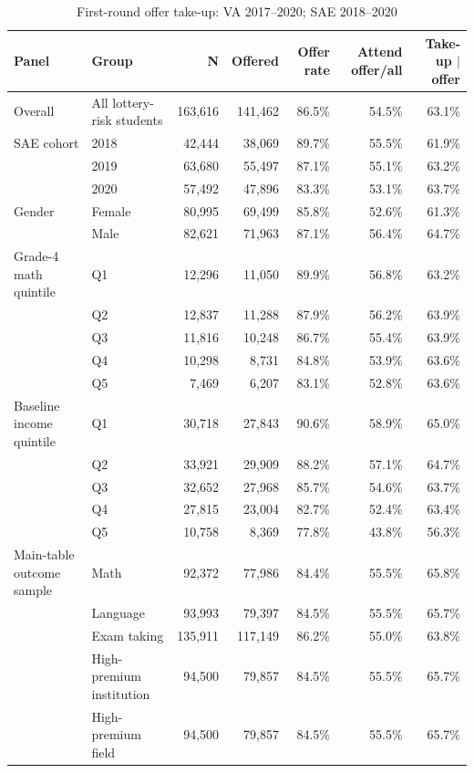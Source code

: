 \begin{table}[!htbp]
\centering
\caption{First-round offer take-up: VA 2017--2020; SAE 2018--2020}
\label{tab:offer-takeup-maximum-data}
\begin{tabular}{llrrrrr}
\toprule
Panel & Group & N & Offered & Offer rate & Attend offer/all & Take-up $\mid$ offer \\
\midrule
Overall & All lottery-risk students & 163,616 & 141,462 & 86.5\% & 54.5\% & 63.1\% \\
\addlinespace
SAE cohort & 2018 & 42,444 & 38,069 & 89.7\% & 55.5\% & 61.9\% \\
 & 2019 & 63,680 & 55,497 & 87.1\% & 55.1\% & 63.2\% \\
 & 2020 & 57,492 & 47,896 & 83.3\% & 53.1\% & 63.7\% \\
\addlinespace
Gender & Female & 80,995 & 69,499 & 85.8\% & 52.6\% & 61.3\% \\
 & Male & 82,621 & 71,963 & 87.1\% & 56.4\% & 64.7\% \\
\addlinespace
Grade-4 math quintile & Q1 & 12,296 & 11,050 & 89.9\% & 56.8\% & 63.2\% \\
 & Q2 & 12,837 & 11,288 & 87.9\% & 56.2\% & 63.9\% \\
 & Q3 & 11,816 & 10,248 & 86.7\% & 55.4\% & 63.9\% \\
 & Q4 & 10,298 & 8,731 & 84.8\% & 53.9\% & 63.6\% \\
 & Q5 & 7,469 & 6,207 & 83.1\% & 52.8\% & 63.6\% \\
\addlinespace
Baseline income quintile & Q1 & 30,718 & 27,843 & 90.6\% & 58.9\% & 65.0\% \\
 & Q2 & 33,921 & 29,909 & 88.2\% & 57.1\% & 64.7\% \\
 & Q3 & 32,652 & 27,968 & 85.7\% & 54.6\% & 63.7\% \\
 & Q4 & 27,815 & 23,004 & 82.7\% & 52.4\% & 63.4\% \\
 & Q5 & 10,758 & 8,369 & 77.8\% & 43.8\% & 56.3\% \\
\addlinespace
Main-table outcome sample & Math & 92,372 & 77,986 & 84.4\% & 55.5\% & 65.8\% \\
 & Language & 93,993 & 79,397 & 84.5\% & 55.5\% & 65.7\% \\
 & Exam taking & 135,911 & 117,149 & 86.2\% & 55.0\% & 63.8\% \\
 & High-premium institution & 94,500 & 79,857 & 84.5\% & 55.5\% & 65.7\% \\
 & High-premium field & 94,500 & 79,857 & 84.5\% & 55.5\% & 65.7\% \\

\end{tabular}
\end{table}
